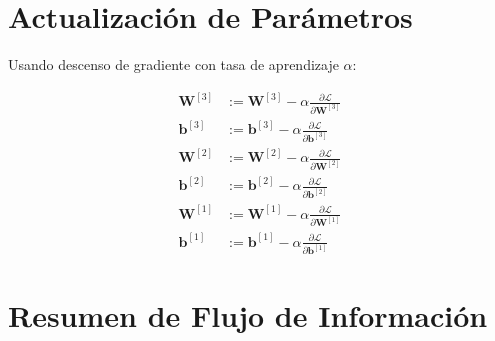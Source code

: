 \documentclass[12pt]{article}
\begin{document}
\section{Actualización de Parámetros}

Usando descenso de gradiente con tasa de aprendizaje $\alpha$:

\begin{align}
\mathbf{W}^{[3]} &:= \mathbf{W}^{[3]} - \alpha \frac{\partial \mathcal{L}}{\partial \mathbf{W}^{[3]}} \\
\mathbf{b}^{[3]} &:= \mathbf{b}^{[3]} - \alpha \frac{\partial \mathcal{L}}{\partial \mathbf{b}^{[3]}} \\
\mathbf{W}^{[2]} &:= \mathbf{W}^{[2]} - \alpha \frac{\partial \mathcal{L}}{\partial \mathbf{W}^{[2]}} \\
\mathbf{b}^{[2]} &:= \mathbf{b}^{[2]} - \alpha \frac{\partial \mathcal{L}}{\partial \mathbf{b}^{[2]}} \\
\mathbf{W}^{[1]} &:= \mathbf{W}^{[1]} - \alpha \frac{\partial \mathcal{L}}{\partial \mathbf{W}^{[1]}} \\
\mathbf{b}^{[1]} &:= \mathbf{b}^{[1]} - \alpha \frac{\partial \mathcal{L}}{\partial \mathbf{b}^{[1]}}
\end{align}

\newpage

\section{Resumen de Flujo de Información}
\end{document}
